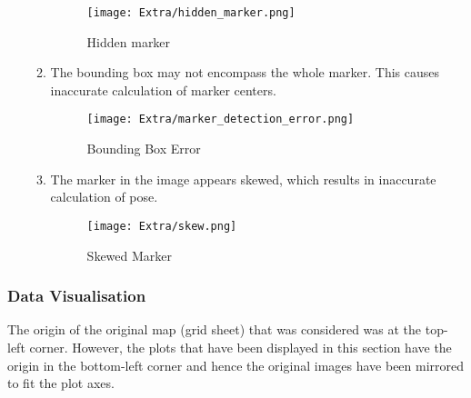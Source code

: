 \begin{enumerate}
\begin{enumerate}
		\begin{figure}[h]
			\centering
			\texttt{[image: Extra/hidden\_marker.png]}
			\caption{ Hidden marker}
		\end{figure}
		
		\item
		The bounding box may not encompass the whole marker. This causes inaccurate calculation of marker centers.
		
		\vspace{0.5cm}
		
		\begin{figure}[H]
			\centering
			\texttt{[image: Extra/marker\_detection\_error.png]}
			\caption{Bounding Box Error}
		\end{figure}
		
		\item
		The marker in the image appears skewed, which results in inaccurate calculation of pose.
		
		\begin{figure}[H]
			\centering
			\texttt{[image: Extra/skew.png]}
			\caption{Skewed Marker}
		\end{figure}
		
		
	\end{enumerate}
	
	
\end{enumerate}


\newpage
\subsubsection{Data Visualisation}

The origin of the original map (grid sheet) that was considered was at the top-left corner. However, the plots that have been displayed in this section have the origin in the bottom-left corner and hence the original images have been mirrored to fit the plot axes.

